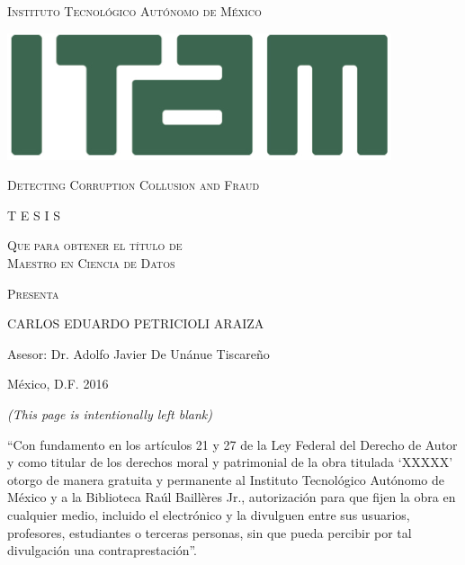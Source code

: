 \thispagestyle{empty}
\begin{center}
\LARGE \scshape Instituto Tecnológico Autónomo de México \\
\end{center}

\vspace{4mm}



\begin{center}
\includegraphics[scale=.7]{../img/ITAM.jpg}


\vspace{15mm}


\scshape \Large Detecting Corruption Collusion and Fraud

\vfill
\scshape \large T E S I S 


\vspace{3mm}
\scshape Que para obtener el título de \\

\vspace{3mm}
\scshape Maestro en Ciencia de Datos

\vspace{3mm}
\scshape Presenta

\vspace{4mm}
\Large CARLOS EDUARDO PETRICIOLI ARAIZA


\vspace{5mm}

\large Asesor: Dr.  Adolfo Javier De Unánue Tiscareño
\end{center}
\vspace{10mm}
México, D.F.   \hfill       2016


\newpage

\thispagestyle{empty}

\begin{flushright}
\textit{(This page is intentionally left blank)}
\end{flushright}

\newpage
\thispagestyle{plain}
\setcounter{page}{1}

\noindent ``Con fundamento en los artículos 21 y 27 de la Ley Federal del Derecho de Autor y como titular de los derechos moral y patrimonial de la obra titulada `{\scshape XXXXX}' otorgo de manera gratuita y permanente al Instituto Tecnológico Autónomo de México y a la Biblioteca Raúl Baillères Jr., autorización para que fijen la obra en cualquier medio, incluido el electrónico y la divulguen entre sus usuarios, profesores, estudiantes o terceras personas, sin que pueda percibir por tal divulgación una contraprestación''.

